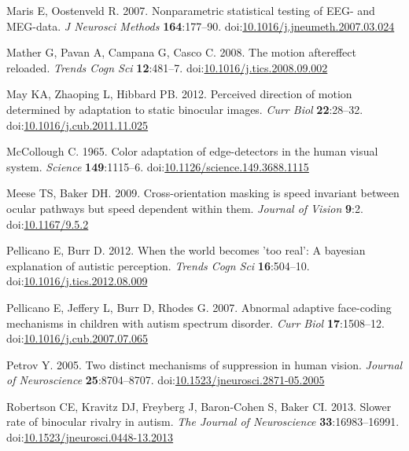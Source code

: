\documentclass[
]{article}
\newlength{\cslhangindent}
\newlength{\cslentryspacingunit} %
\newenvironment{CSLReferences}[2] %
 {%
  \setlength{\parindent}{0pt}
  \ifodd #1
  \let\oldpar\par
  \def\par{\hangindent=\cslhangindent\oldpar}
  \fi
  \setlength{\parskip}{#2\cslentryspacingunit}
 }%
 {}
\begin{document}
\begin{CSLReferences}{1}{0}
\leavevmode{}%
Maris E, Oostenveld R. 2007. Nonparametric statistical testing of EEG- and MEG-data. \emph{J Neurosci Methods} \textbf{164}:177--90. doi:\href{https://doi.org/10.1016/j.jneumeth.2007.03.024}{10.1016/j.jneumeth.2007.03.024}

\leavevmode{}%
Mather G, Pavan A, Campana G, Casco C. 2008. The motion aftereffect reloaded. \emph{Trends Cogn Sci} \textbf{12}:481--7. doi:\href{https://doi.org/10.1016/j.tics.2008.09.002}{10.1016/j.tics.2008.09.002}

\leavevmode{}%
May KA, Zhaoping L, Hibbard PB. 2012. Perceived direction of motion determined by adaptation to static binocular images. \emph{Curr Biol} \textbf{22}:28--32. doi:\href{https://doi.org/10.1016/j.cub.2011.11.025}{10.1016/j.cub.2011.11.025}

\leavevmode{}%
McCollough C. 1965. Color adaptation of edge-detectors in the human visual system. \emph{Science} \textbf{149}:1115--6. doi:\href{https://doi.org/10.1126/science.149.3688.1115}{10.1126/science.149.3688.1115}

\leavevmode{}%
Meese TS, Baker DH. 2009. Cross-orientation masking is speed invariant between ocular pathways but speed dependent within them. \emph{Journal of Vision} \textbf{9}:2. doi:\href{https://doi.org/10.1167/9.5.2}{10.1167/9.5.2}

\leavevmode{}%
Pellicano E, Burr D. 2012. When the world becomes 'too real': A bayesian explanation of autistic perception. \emph{Trends Cogn Sci} \textbf{16}:504--10. doi:\href{https://doi.org/10.1016/j.tics.2012.08.009}{10.1016/j.tics.2012.08.009}

\leavevmode{}%
Pellicano E, Jeffery L, Burr D, Rhodes G. 2007. Abnormal adaptive face-coding mechanisms in children with autism spectrum disorder. \emph{Curr Biol} \textbf{17}:1508--12. doi:\href{https://doi.org/10.1016/j.cub.2007.07.065}{10.1016/j.cub.2007.07.065}

\leavevmode{}%
Petrov Y. 2005. Two distinct mechanisms of suppression in human vision. \emph{Journal of Neuroscience} \textbf{25}:8704--8707. doi:\href{https://doi.org/10.1523/jneurosci.2871-05.2005}{10.1523/jneurosci.2871-05.2005}

\leavevmode{}%
Robertson CE, Kravitz DJ, Freyberg J, Baron-Cohen S, Baker CI. 2013. Slower rate of binocular rivalry in autism. \emph{The Journal of Neuroscience} \textbf{33}:16983--16991. doi:\href{https://doi.org/10.1523/jneurosci.0448-13.2013}{10.1523/jneurosci.0448-13.2013}


\end{CSLReferences}
\end{document}
